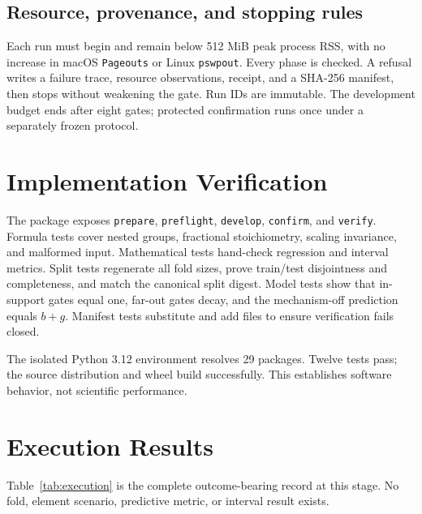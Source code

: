 \documentclass[11pt]{article}
\begin{document}
\subsection{Resource, provenance, and stopping rules}
Each run must begin and remain below 512 MiB peak process RSS, with no increase
in macOS \texttt{Pageouts} or Linux \texttt{pswpout}. Every phase is checked.
A refusal writes a failure trace, resource observations, receipt, and a
SHA-256 manifest, then stops without weakening the gate. Run IDs are immutable.
The development budget ends after eight gates; protected confirmation runs once
under a separately frozen protocol.

\section{Implementation Verification}
The package exposes \texttt{prepare}, \texttt{preflight}, \texttt{develop},
\texttt{confirm}, and \texttt{verify}. Formula tests cover nested groups,
fractional stoichiometry, scaling invariance, and malformed input. Mathematical
tests hand-check regression and interval metrics. Split tests regenerate all
fold sizes, prove train/test disjointness and completeness, and match the
canonical split digest. Model tests show that in-support gates equal one,
far-out gates decay, and the mechanism-off prediction equals $b+g$. Manifest
tests substitute and add files to ensure verification fails closed.

The isolated Python 3.12 environment resolves 29 packages. Twelve tests pass;
the source distribution and wheel build successfully. This establishes
software behavior, not scientific performance.

\section{Execution Results}
Table~\ref{tab:execution} is the complete outcome-bearing record at this stage.
No fold, element scenario, predictive metric, or interval result exists.
\end{document}
